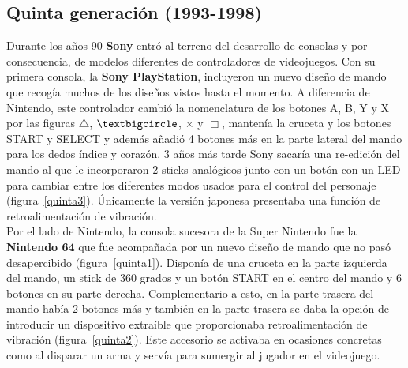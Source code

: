 \subsection{Quinta generaci\'on (1993-1998)}



Durante los a\~nos 90 \textbf{Sony} entr\'o al terreno del desarrollo de consolas y por consecuencia, de modelos diferentes de controladores de videojuegos. Con su primera consola, la \textbf{Sony PlayStation}, incluyeron un nuevo dise\~no de mando que recog\'ia muchos de los dise\~nos vistos hasta el momento. A diferencia de Nintendo, este controlador cambi\'o la nomenclatura de los botones A, B, Y y X por las figuras $\triangle$, $\textbigcircle$, $\times$ y $\Box$, manten\'ia la cruceta y los botones START y SELECT y adem\'as a\~nadi\'o 4 botones m\'as en la parte lateral del mando para los dedos \'indice y coraz\'on. 3 a\~nos m\'as tarde Sony sacar\'ia una re-edici\'on del mando al que le incorporaron 2 sticks anal\'ogicos junto con un bot\'on con un LED para cambiar entre los diferentes modos usados para el control del personaje (figura~\ref{quinta3}). \'Unicamente la versi\'on japonesa presentaba una funci\'on de retroalimentaci\'on de vibraci\'on. \\

Por el lado de Nintendo, la consola sucesora de la Super Nintendo fue la \textbf{Nintendo 64} que fue acompa\~nada por un nuevo dise\~no de mando que no pas\'o desapercibido (figura~\ref{quinta1}). Dispon\'ia de una cruceta en la parte izquierda del mando, un stick de 360 grados y un bot\'on START en el centro del mando y 6 botones en su parte derecha. Complementario a esto, en la parte trasera del mando hab\'ia 2 botones m\'as y tambi\'en en la parte trasera se daba la opci\'on de introducir un dispositivo extra\'ible que proporcionaba retroalimentaci\'on de vibraci\'on (figura~\ref{quinta2}). Este accesorio se activaba en ocasiones concretas como al disparar un arma y serv\'ia para sumergir al jugador en el videojuego.\\

